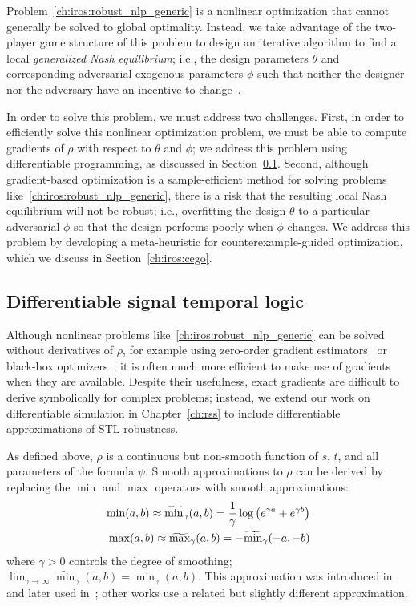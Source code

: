 Problem~\eqref{ch:iros:robust_nlp_generic} is a nonlinear optimization that cannot generally be solved to global optimality. Instead, we take advantage of the two-player game structure of this problem to design an iterative algorithm to find a local \textit{generalized Nash equilibrium}; i.e., the design parameters $\theta$ and corresponding adversarial exogenous parameters $\phi$ such that neither the designer nor the adversary have an incentive to change~\cite{facchineiGeneralizedNashEquilibrium2007}.

In order to solve this problem, we must address two challenges. First, in order to efficiently solve this nonlinear optimization problem, we must be able to compute gradients of $\rho$ with respect to $\theta$ and $\phi$; we address this problem using differentiable programming, as discussed in Section~\ref{ch:iros:diffstl}. Second, although gradient-based optimization is a sample-efficient method for solving problems like~\eqref{ch:iros:robust_nlp_generic}, there is a risk that the resulting local Nash equilibrium will not be robust; i.e., overfitting the design $\theta$ to a particular adversarial $\phi$ so that the design performs poorly when $\phi$ changes. We address this problem by developing a meta-heuristic for counterexample-guided optimization, which we discuss in Section~\ref{ch:iros:cego}.

\subsection{Differentiable signal temporal logic}\label{ch:iros:diffstl}

Although nonlinear problems like~\eqref{ch:iros:robust_nlp_generic} can be solved without derivatives of $\rho$, for example using zero-order gradient estimators~\cite{suh2021_bundled_gradients} or black-box optimizers~\cite{corsoSurveyAlgorithmsBlackBox2021}, it is often much more efficient to make use of gradients when they are available. Despite their usefulness, exact gradients are difficult to derive symbolically for complex problems; instead, we extend our work on differentiable simulation in Chapter~\ref{ch:rss} to include differentiable approximations of STL robustness.

As defined above, $\rho$ is a continuous but non-smooth function of $s$, $t$, and all parameters of the formula $\psi$. Smooth approximations to $\rho$ can be derived by replacing the $\min$ and $\max$ operators with smooth approximations:
\begin{align}
	\min(a, b) \approx \widetilde{\min}_\gamma(a, b) = \frac{1}{\gamma} \log\left( e^{\gamma a} + e^{\gamma b} \right) \label{ch:iros:smooth_min} \\
	\max(a, b) \approx \widetilde{\max}_\gamma(a, b) = -\widetilde{\min}_{\gamma}(-a, -b) \label{ch:iros:smooth_max}
\end{align}
where $\gamma > 0$ controls the degree of smoothing; $\lim_{\gamma \to \infty} \widetilde{\min}_\gamma(a, b) = \min_\gamma(a, b)$. This approximation was introduced in~\cite{pantSmoothOperatorControl2017} and later used in~\cite{pantFlybyLogicControlMultiDrone2018,pantazidesSatelliteMissionPlanning2022}; other works \cite{leungBackPropagationSignalTemporal2021} use a related but slightly different approximation.

